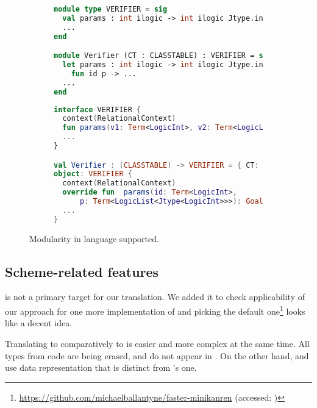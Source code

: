  \begin{figure}[ht]
   \begin{subfigure}[t]{\textwidth}
      \begin{lstlisting}[language=ocaml]
module type VERIFIER = sig
  val params : int ilogic -> int ilogic Jtype.injected Std.List.injected -> goal
  ...
end

module Verifier (CT : CLASSTABLE) : VERIFIER = struct
  let params : int ilogic -> int ilogic Jtype.injected Std.List.injected -> goal =
    fun id p -> ...
  ...
end
      \end{lstlisting}
   \end{subfigure}
   \begin{subfigure}[t]{\textwidth}
      \begin{lstlisting}[language=kotlin]
interface VERIFIER {
  context(RelationalContext)
  fun params(v1: Term<LogicInt>, v2: Term<LogicList<Jtype<LogicInt>>>): Goal
  ...
}

val Verifier : (CLASSTABLE) -> VERIFIER = { CT: CLASSTABLE ->
object: VERIFIER {
  context(RelationalContext)
  override fun  params(id: Term<LogicInt>,
      p: Term<LogicList<Jtype<LogicInt>>>): Goal = ...
  ...
}
      \end{lstlisting}
   \end{subfigure}
   \caption{Modularity in \OCaml{} language supported.}
   \label{fig:modularity}
 \end{figure}

\subsection{Scheme-related features}

\Scheme{} is not a primary target for our translation.
We added it to check applicability of our approach for one more implementation of \miniKanren{} and picking the default one\footnote{\url{https://github.com/michaelballantyne/faster-minikanren} (accessed: )} looks like a decent idea.

Translating to \Scheme{} comparatively to \Kotlin{} is easier and more complex at the same time.
All types from \OCanren{} code are being erased, and do not appear in \Scheme{}.
On the other hand, \OCanren{} and \Klogic{} use data representation that is distinct from \Scheme{}'s one.

